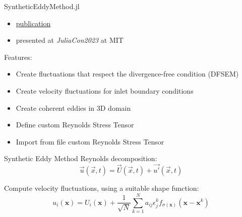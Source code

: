 \begin{frame}{SyntheticEddyMethod.jl}
\begin{itemize}
\item \href{https://www.theoj.org/joss-papers/joss.05565/10.21105.joss.05565.pdf}{publication}
\item presented at \textit{JuliaCon2023} at MIT
\end{itemize}

Features:
\begin{itemize}
\item Create fluctuations that respect the divergence-free condition (DFSEM)
\item Create velocity fluctuations for inlet boundary conditions
\item Create coherent eddies in 3D domain
\item Define custom Reynolds Stress Tensor
\item Import from file custom Reynolds Stress Tensor
\end{itemize}
\end{frame}


\begin{frame}{Synthetic Eddy Method}
Reynolds decomposition:
\begin{equation}
    \Vec{u}(\Vec{x},t) = \Vec{U}(\Vec{x},t) +  \Vec{u'}(\Vec{x},t)
    \label{sem:u}
\end{equation}

Compute velocity fluctuations, using a suitable shape function:
\begin{equation}
u_i(\boldsymbol{x})=U_i(\boldsymbol{x})+\frac{1}{\sqrt{N}} \sum_{k=1}^N a_{i j} \epsilon_j^k f_{\sigma(\boldsymbol{x})}\left(\boldsymbol{x}-\boldsymbol{x}^k\right)
\label{sem:ui}
\end{equation}
\end{frame}
